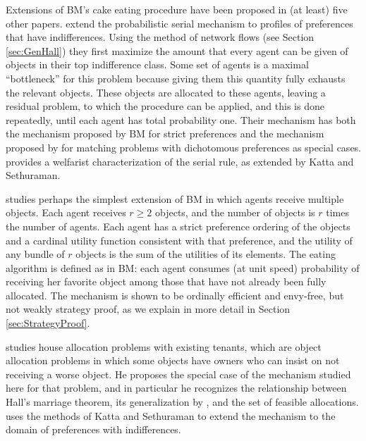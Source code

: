 \documentclass[12pt]{article}
\theoremstyle{definition}
\begin{document}
Extensions of BM's cake eating procedure have been proposed in (at least) five other papers.  \cite{KaSe06} extend the probabilistic serial mechanism to profiles of preferences that have indifferences.  Using the method of network flows (see Section \ref{sec:GenHall}) they first maximize the amount that every agent can be given of objects in their top indifference class.   Some set of agents is  a maximal ``bottleneck'' for this problem because giving them this quantity fully exhausts the relevant objects.  These objects are allocated to these agents, leaving a residual problem, to which the procedure can be applied, and this is done repeatedly, until each agent has total probability one.  Their mechanism has both the mechanism proposed by BM for strict preferences and the mechanism proposed by \cite{bm04} for matching problems with dichotomous preferences as special cases. \cite{bog15} provides a welfarist characterization of the serial rule, as extended by Katta and Sethuraman.

\cite{kojima09mss} studies perhaps the simplest extension of BM in which agents receive multiple objects.  Each agent receives $r \ge 2$ objects, and the number of objects is $r$ times the number of agents.  Each agent has a strict preference ordering of the objects and a cardinal utility function consistent with that preference, and the utility of any bundle of $r$ objects is the sum of the utilities of its elements.  The eating algorithm is defined as in BM: each agent consumes (at unit speed) probability of receiving her favorite object among those that have not already been fully allocated.  The mechanism is shown to be ordinally efficient and envy-free, but not weakly strategy proof, as we explain in more detail in Section \ref{sec:StrategyProof}.

\cite{yilmaz10geb} studies house allocation problems with existing tenants, which are object allocation problems in which some objects have owners who can insist on not receiving a worse object.  He proposes the special case of the mechanism studied here for that problem, and in particular he recognizes the relationship between Hall's marriage theorem, its generalization by \cite{Gal57}, and the set of feasible allocations.  \cite{yilmaz09geb} uses the methods of Katta and Sethuraman to extend the mechanism to the domain of preferences with indifferences.
\end{document}
